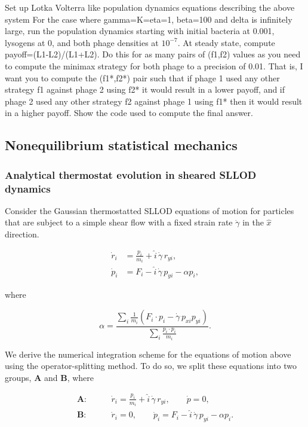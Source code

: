 Set up Lotka Volterra like population dynamics equations describing the above system
For the case where gamma=K=eta=1, beta=100 and delta is infinitely large, run the population dynamics starting with initial bacteria at 0.001, lysogens at 0, and both phage densities at $10^{-7}$. At steady state, compute payoff=(L1-L2)/(L1+L2). Do this for as many pairs of (f1,f2) values as you need to compute the minimax strategy for both phage to a precision of 0.01. That is, I want you to compute the (f1*,f2*) pair such that if phage 1 used any other strategy f1 against phage 2 using f2* it would result in a lower payoff, and if phage 2 used any other strategy f2 against phage 1 using f1* then it would result in a higher payoff. Show the code used to compute the final answer.

\subsection{Nonequilibrium statistical mechanics}
\label{problems:nonequilibrium}

\subsubsection{Analytical thermostat evolution in sheared SLLOD dynamics}
\label{problem:sllod-thermostat}
Consider the Gaussian thermostatted SLLOD equations of motion for particles
that are subject to a simple shear flow with a fixed strain rate $\dot{\gamma}$
in the $\hat{x}$ direction.

\begin{align}
\dot{r}_i
&=
\frac{p_i}{m_i}
+
\hat{i}\,\dot{\gamma}\,r_{yi},
\tag{1}
\\
\dot{p}_i
&=
F_i
-
\hat{i}\,\dot{\gamma}\,p_{yi}
-
\alpha p_i,
\tag{2}
\end{align}

where

\begin{equation}
\alpha
=
\frac{
\displaystyle
\sum_i \frac{1}{m_i}
\left(
F_i \cdot p_i
-
\dot{\gamma}\,p_{xi}p_{yi}
\right)
}{
\displaystyle
\sum_i \frac{p_i\cdot p_i}{m_i}
}.
\tag{3}
\end{equation}

We derive the numerical integration scheme for the equations of motion above
using the operator-splitting method. To do so, we split these equations into
two groups, $\mathbf{A}$ and $\mathbf{B}$, where

\begin{align}
\mathbf{A}:\qquad
&\dot{r}_i
=
\frac{p_i}{m_i}
+
\hat{i}\,\dot{\gamma}\,r_{yi},
\qquad
\dot{p}=0,
\tag{4}
\\
\mathbf{B}:\qquad
&\dot{r}_i=0,
\qquad
\dot{p}_i
=
F_i
-
\hat{i}\,\dot{\gamma}\,p_{yi}
-
\alpha p_i.
\tag{5}
\end{align}



